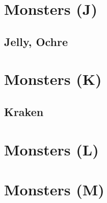 \FloatBarrier
\section{Monsters (J)}
\subsection{Jelly, Ochre}



\FloatBarrier
\section{Monsters (K)}\label{sec:monsters-k}

\subsection{Kraken}

\FloatBarrier
\section{Monsters (L)}\label{sec:monsters-l}


\FloatBarrier
\section{Monsters (M)}\label{sec:monsters-m}



